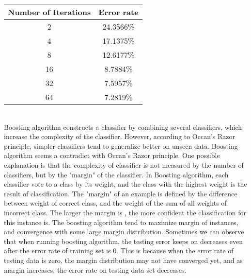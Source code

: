 \documentclass[a4paper,11pt]{article}
\begin{document}
\vspace{0.5cm}
\begin{tabular}{c c}
Number of Iterations	& Error rate\\
\hline \hline
	2		& 24.3566\%\\
	4		& 17.1375\%\\
	8		& 12.6177\%\\
	16		& 8.7884\%\\
	32		& 7.5957\%\\
	64		& 7.2819\%\\
\end{tabular}
\vspace{0.5cm}\\
Boosting algorithm constructs a classifier by combining several classifiers, which increase the complexity of the classifier. However, according to Occan's Razor principle, simpler classifiers tend to generalize better on unseen data. Boosting algorithm seems a contradict with Occan's Razor principle.
One possible explanation is that the complexity of classifier is not measured by the number of classifiers, but by the "margin" of the classifier.
In Boosting algorithm, each classifier vote to a class by its weight, and the class with the highest weight is the result of classification. The "margin" of an example is defined by the difference between weight of correct class, and the weight of the sum of all weights of incorrect class. The larger the margin is , the more confident the classification for this instance is. The boosting algorithm tend to maximize margin of instances, and convergence with some large margin distribution. Sometimes we can observe that when running boosting algorithm, the testing error keeps on decreases even after the error rate of training set is 0. This is because when the error rate of testing data is zero, the margin distribution may not have converged yet, and as margin increases, the error rate on testing data set decreases.
\end{document}
